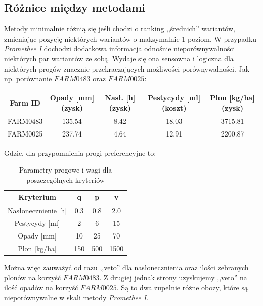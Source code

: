 \documentclass[11pt]{article}
\begin{document}
\subsection{Różnice między metodami}
Metody minimalnie różnią się jeśli chodzi o ranking ,,średnich'' wariantów, zmieniając pozycję niektórych wariantów o maksymalnie 1 poziom. W przypadku \textit{Promethee I} dochodzi dodatkowa informacja odnośnie nieporównywalności niektórych par wariantów ze sobą. Wydaje się ona sensowna i logiczna dla niektórych progów znacznie przekraczających możliwości porównywalności. Jak np. porównanie $FARM0483$ oraz $FARM0025$:
\begin{table}[H]
\centering
\begin{tabular}{|c||c|c|c|c|}
\hline
\textbf{Farm ID} & \textbf{Opady [mm] (zysk)} & \textbf{Nasł. [h] (zysk)} & \textbf{Pestycydy [ml] (koszt)} & \textbf{Plon [kg/ha] (zysk)} \\
\hline
FARM0483 & 135.54 & 8.42 & 18.03 & 3715.81 \\
\hline
FARM0025 & 237.74 & 4.64 & 12.91 & 2200.87 \\
\hline
\end{tabular}
\end{table}

Gdzie, dla przypomnienia progi preferencyjne to:
\begin{table}[H]
\centering
\begin{tabular}{|c||c|c|c|}
\hline
\textbf{Kryterium} & \textbf{q} & \textbf{p} & \textbf{v} \\
\hline
Nasłonecznienie [h] & 0.3 & 0.8 & 2.0  \\
\hline
Pestycydy [ml] & 2 & 6 & 15 \\
\hline
Opady [mm] & 10 & 25 & 70 \\
\hline
Plon [kg/ha] & 150 & 500 & 1500 \\
\hline
\end{tabular}
\caption{Parametry progowe i wagi dla poszczególnych kryteriów}
\end{table}

Można więc zauważyć od razu ,,veto'' dla nasłonecznienia oraz ilości zebranych plonów na korzyść $FARM0483$. Z drugiej jednak strony uzyskujemy ,,veto'' na ilość opadów na korzyść $FARM0025$. Są to dwa zupełnie różne obozy, które są nieporównywalne w skali metody \textit{Promethee I}.
\end{document}
